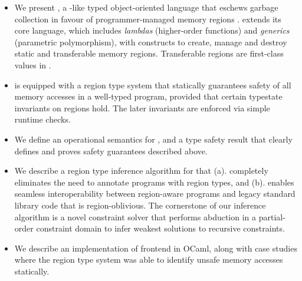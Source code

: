 \begin{itemize} 
  \item We present \name, a \csharp-like typed
  object-oriented language that eschews garbage collection in favour of
  programmer-managed memory regions . \name extends its core language,
  which includes \emph{lambdas} (higher-order functions) and
  \emph{generics} (parametric polymorphism), with constructs to create,
  manage and destroy static and transferable memory regions. Transferable regions
  are first-class values in \name.

  \item \name is equipped with a region type system that statically
  guarantees safety of all memory accesses in a well-typed program,
  provided that certain typestate invariants on regions hold.  The
  later invariants are enforced via simple runtime checks.

  \item We define an operational semantics for \name, and a type
  safety result that clearly defines and proves safety guarantees
  described above.

  \item We describe a region type inference algorithm for \name that
  (a). completely eliminates the need to annotate \name programs with
  region types, and (b). enables seamless interoperability between
  region-aware \name programs and legacy standard library code that is
  region-oblivious. The cornerstone of our inference algorithm is a
  novel constraint solver that performs abduction in a partial-order
  constraint domain to infer weakest solutions to recursive
  constraints.

  \item We describe an implementation of \name frontend in OCaml,
  along with case studies where the region type system was able to
  identify unsafe memory accesses statically.
  
\end{itemize}

